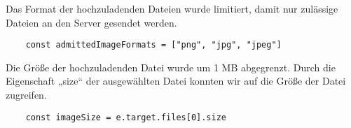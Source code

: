 Das Format der hochzuladenden Dateien wurde limitiert, damit nur zulässige Dateien an den Server gesendet werden.
\begin{lstlisting}
    const admittedImageFormats = ["png", "jpg", "jpeg"]
\end{lstlisting}

Die Größe der hochzuladenden Datei wurde um 1 MB abgegrenzt.
Durch die Eigenschaft „size“ der ausgewählten Datei konnten wir auf die Größe der Datei zugreifen.
\begin{lstlisting}
    const imageSize = e.target.files[0].size
\end{lstlisting}
